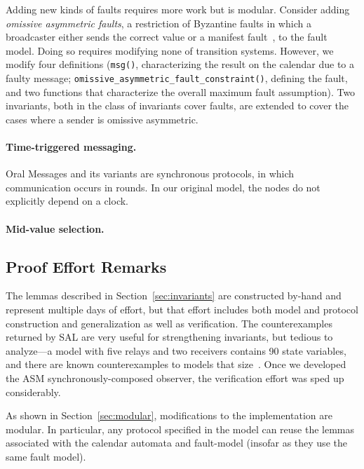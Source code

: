 \documentclass{llncs/llncs}
\newcommand{\lee}[1]{ } %
\newcommand{\lee}[1]{ {\color{blue}$<$lee: #1$>$} } %
\begin{document}
Adding new kinds of faults requires more work but is modular. Consider adding \emph{omissive asymmetric faults}, a restriction of Byzantine faults in which a broadcaster either sends the correct value or a manifest fault~\cite{}, to the fault model. Doing so requires modifying none of transition systems. However, we modify four definitions (\texttt{msg()}, characterizing the result on the calendar due to a faulty message; \texttt{omissive_asymmetric_fault_constraint()}, defining the fault, and two functions that characterize the overall maximum fault assumption). Two invariants, both in the class of invariants cover faults, are extended to cover the cases where a sender is omissive asymmetric.

\paragraph{Time-triggered messaging.}
Oral Messages and its variants are synchronous protocols, in which communication occurs in rounds. In our original model, the nodes do not explicitly depend on a clock. 


\lee{todo}

\paragraph{Mid-value selection.}

\lee{todo}

\lee{any other modifications?}

\subsection{Proof Effort Remarks}
The lemmas described in Section~\ref{sec:invariants} are constructed by-hand and represent multiple days of effort, but that effort includes both model and protocol construction and generalization as well as verification. The counterexamples returned by SAL are very useful for strengthening invariants, but tedious to analyze---a model with five relays and two receivers contains 90 state variables, and there are known counterexamples to models that size~\cite{csl-93-2}. Once we developed the ASM synchronously-composed observer, the verification effort was sped up considerably.

As shown in Section~\ref{sec:modular}, modifications to the implementation are modular. In particular, any protocol specified in the model can reuse the lemmas associated with the calendar automata and fault-model (insofar as they use the same fault model).
\end{document}
